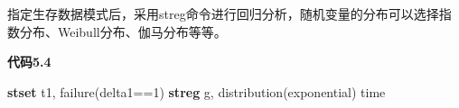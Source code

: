 \documentclass[
  chinese-hans,
  letterpaper,
  DIV=11,
  numbers=noendperiod]{scrreprt}
\newenvironment{Shaded}{\begin{snugshade}}{\end{snugshade}}
\newcommand{\KeywordTok}[1]{\textcolor[rgb]{0.00,0.23,0.31}{\textbf{#1}}}
\newcommand{\NormalTok}[1]{\textcolor[rgb]{0.00,0.23,0.31}{#1}}
\begin{document}
指定生存数据模式后，采用streg命令进行回归分析，随机变量的分布可以选择指数分布、Weibull分布、伽马分布等等。

\begin{tcolorbox}[enhanced jigsaw, arc=.35mm, bottomrule=.15mm, breakable, colback=white, colframe=quarto-callout-note-color-frame, left=2mm, leftrule=.75mm, opacityback=0, rightrule=.15mm, toprule=.15mm]

\vspace{-3mm}\textbf{代码5.4}\vspace{3mm}

\begin{Shaded}
\begin{Highlighting}[]
\KeywordTok{stset}\NormalTok{ t1, failure(delta1==1)}
\KeywordTok{streg}\NormalTok{ g, distribution(exponential) time}
\end{Highlighting}
\end{Shaded}

\end{tcolorbox}
\end{document}
